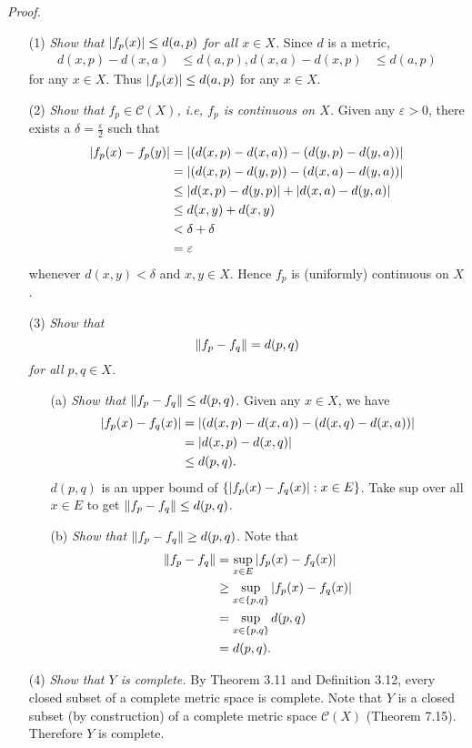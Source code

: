 \documentclass{article}
\begin{document}
\emph{Proof.}
\begin{enumerate}
\item[(1)]
  \emph{Show that $\abs{ f_p(x) } \leq d(a,p)$ for all $x \in X$.}
  Since $d$ is a metric,
  \begin{align*}
    d(x,p) - d(x,a) &\leq d(a,p),
    d(x,a) - d(x,p) &\leq d(a,p)
  \end{align*}
  for any $x \in X$.
  Thus $\abs{ f_p(x) } \leq d(a,p)$ for any $x \in X$.

\item[(2)]
  \emph{Show that $f_p \in \mathscr{C}(X)$, i.e, $f_p$ is continuous on $X$.}
  Given any $\varepsilon > 0$, there exists a $\delta = \frac{\varepsilon}{2}$ such that
  \begin{align*}
    \abs{ f_p(x) - f_p(y) }
    &= \abs{ (d(x,p) - d(x,a)) - (d(y,p) - d(y,a)) } \\
    &= \abs{ (d(x,p) - d(y,p)) - (d(x,a) - d(y,a)) } \\
    &\leq \abs{ d(x,p) - d(y,p) } + \abs{ d(x,a) - d(y,a) } \\
    &\leq d(x,y) + d(x,y) \\
    &< \delta + \delta \\
    &= \varepsilon
  \end{align*}
  whenever $d(x,y) < \delta$ and $x,y \in X$.
  Hence $f_p$ is (uniformly) continuous on $X$.

\item[(3)]
  \emph{Show that
  \[
    \norm{ f_p - f_q } = d(p,q)
  \]
  for all $p,q \in X$.}
  \begin{enumerate}
  \item[(a)]
    \emph{Show that $\norm{ f_p - f_q } \leq d(p,q)$.}
    Given any $x \in X$, we have
    \begin{align*}
      \abs{f_p(x)-f_q(x)}
      &= \abs{(d(x,p) - d(x,a))-(d(x,q) - d(x,a))} \\
      &= \abs{d(x,p) - d(x,q)} \\
      &\leq d(p,q).
    \end{align*}
    $d(p,q)$ is an upper bound of $\left\{ \abs{f_p(x)-f_q(x)} : x \in E \right\}$.
    Take sup over all $x \in E$ to get $\norm{ f_p - f_q } \leq d(p,q)$.

  \item[(b)]
    \emph{Show that $\norm{ f_p - f_q } \geq d(p,q)$.}
    Note that
    \begin{align*}
      \norm{ f_p - f_q }
      &= \sup_{x \in E} \abs{f_p(x)-f_q(x)} \\
      &\geq \sup_{x \in \{p,q\}} \abs{f_p(x)-f_q(x)} \\
      &= \sup_{x \in \{p,q\}} d(p,q) \\
      &= d(p,q).
    \end{align*}
  \end{enumerate}

\item[(4)]
  \emph{Show that $Y$ is complete.}
  By Theorem 3.11 and Definition 3.12,
  every closed subset of a complete metric space is complete.
  Note that $Y$ is a closed subset (by construction)
  of a complete metric space $\mathscr{C}(X)$ (Theorem 7.15).
  Therefore $Y$ is complete.
\end{enumerate}
\end{document}
